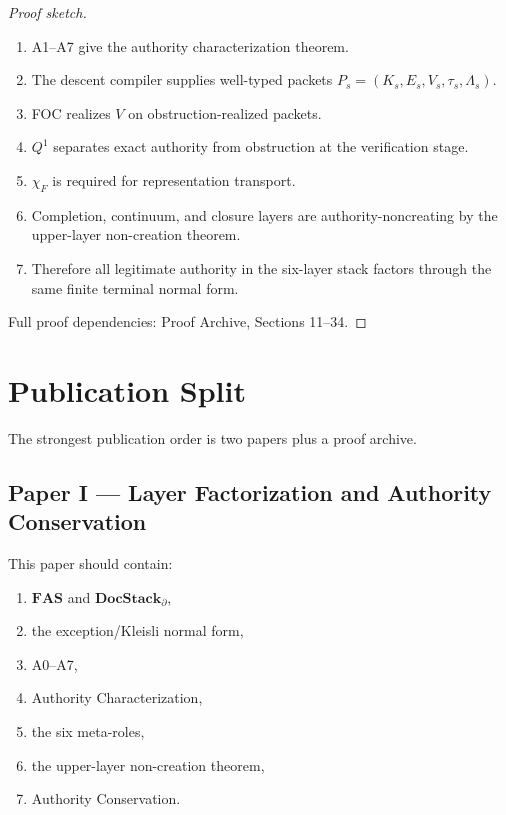 \documentclass[11pt]{article}
\begin{document}
\begin{proof}[Proof sketch]
\begin{enumerate}
    \item A1--A7 give the authority characterization theorem.
    \item The descent compiler supplies well-typed packets \(P_s=(K_s,E_s,V_s,\tau_s,\Lambda_s)\).
    \item FOC realizes \(V\) on obstruction-realized packets.
    \item \(Q^1\) separates exact authority from obstruction at the verification stage.
    \item \(\chi_F\) is required for representation transport.
    \item Completion, continuum, and closure layers are authority-noncreating by the upper-layer non-creation theorem.
    \item Therefore all legitimate authority in the six-layer stack factors through the same finite terminal normal form.
\end{enumerate}

Full proof dependencies: Proof Archive, Sections 11--34.
\end{proof}

\section{Publication Split}

The strongest publication order is two papers plus a proof archive.

\subsection{Paper I — Layer Factorization and Authority Conservation}

This paper should contain:

\begin{enumerate}
    \item \(\mathbf{FAS}\) and \(\mathbf{DocStack}_{\partial}\),
    \item the exception/Kleisli normal form,
    \item A0--A7,
    \item Authority Characterization,
    \item the six meta-roles,
    \item the upper-layer non-creation theorem,
    \item Authority Conservation.
\end{enumerate}
\end{document}
